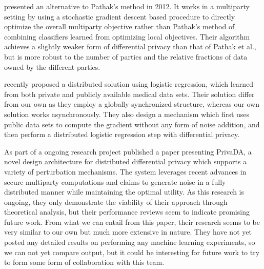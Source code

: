 \cite{rajkumar2012differentially} presented an alternative to Pathak's method in 2012. It works in a multiparty setting by using a stochastic gradient descent based procedure to directly optimize the overall multiparty objective rather than Pathak's method of combining classifiers learned from optimizing local objectives. Their algorithm achieves a slightly weaker form of differential privacy than that of Pathak et al., but is more robust to the number of parties and the relative fractions of data owned by the different parties.

\cite{ji2014DisLogReg} recently proposed a distributed solution using logistic regression, which learned from both private and publicly available medical data sets. Their solution differ from our own as they employ a globally synchronized structure, whereas our own solution works asynchronously. They also design a mechanism which first uses public data sets to compute the gradient without any form of noise addition, and then perform a distributed logistic regression step with differential privacy. 

As part of a ongoing research project \cite{eigner2014privada} published a paper presenting PrivaDA, a novel design architecture for distributed differential privacy which supports a variety of perturbation mechanisms. The system leverages recent advances in secure multiparty computations and claims to generate noise in a fully distributed manner while maintaining the optimal utility. As this research is ongoing, they only demonstrate the viability of their approach through theoretical analysis, but their performance reviews seem to indicate promising future work. From what we can entail from this paper, their research seems to be very similar to our own but much more extensive in nature. They have not yet posted any detailed results on performing any machine learning experiments, so we can not yet compare output, but it could be interesting for future work to try to form some form of collaboration with this team. 


